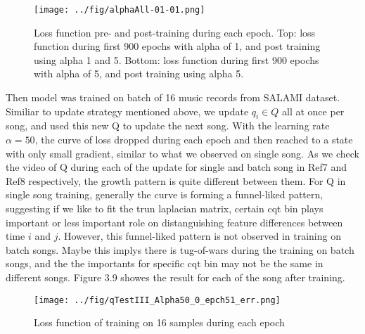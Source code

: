 \documentclass[final]{siamltexmm}
\begin{document}
\begin{figure}[H]
\centering
   \texttt{[image: ../fig/alphaAll-01-01.png]}
\caption{Loss function pre- and post-training during each epoch. Top: loss function during first 900 epochs with alpha of 1, and post training using alpha 1 and 5. Bottom: loss function during first 900 epochs with alpha of 5, and post training using alpha 5.}
\end{figure}
Then model was trained on batch of 16 music records from SALAMI dataset. Similiar to update strategy mentioned above, we update $q_i \in Q$ all at once per song, and used this new Q to update the next song. With the learning rate $\alpha = 50$, the curve of loss dropped during each epoch and then reached to a state with only small gradient, similar to what we observed on single song. As we check the video of Q during each of the update for single and batch song in Ref7 and Ref8 respectively, the growth pattern is quite different between them. For Q in single song training, generally the curve is forming a funnel-liked pattern, suggesting if we like to fit the trun laplacian matrix, certain cqt bin plays important or less important role on distanguishing feature differences between time $i$ and $j$. However, this funnel-liked pattern is not observed in training on batch songs. Maybe this implys there is tug-of-wars during the training on batch songs, and the the importants for specific cqt bin may not be the same in different songs. Figure 3.9 showes the result for each of the song after training.
\begin{figure}[H]
\centering
   \texttt{[image: ../fig/qTestIII\_Alpha50\_0\_epch51\_err.png]}
\caption{Loss function of training on 16 samples during each epoch}
\end{figure}
\end{document}
